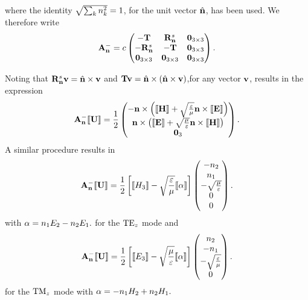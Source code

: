 where the identity $\sqrt{\sum_{k} n_{k}^2} = 1$, for the unit vector $\hat{\mathbf{n}}$, has been used. We therefore write
\begin{align*}
\mathbf{A}_\mathbf{n}^{-} = c
\begin{pmatrix}
  -\mathbf{T} & \mathbf{R}^{s}_{\mathbf{n}} & \mathbf{0}_{3\times3} \\
  -\mathbf{R}^{s}_{\mathbf{n}}  & -\mathbf{T} & \mathbf{0}_{3\times3} \\
   \mathbf{0}_{3\times3} & \mathbf{0}_{3\times3} & \mathbf{0}_{3\times3} 
\end{pmatrix} .
\end{align*}

Noting that $\mathbf{R}^{s}_{\mathbf{n}} \mathbf{v} = \hat{\mathbf{n}} \times \mathbf{v}$ and $\mathbf{T} \mathbf{v} = \hat{\mathbf{n}} \times \left(  \hat{\mathbf{n}}
  \times \mathbf{v} \right)$,for any vector $\mathbf{v}$, results in the expression
\begin{align}
\mathbf{A}_\mathbf{n}^{-} \llbracket \mathbf{U} \rrbracket = \frac{1}{2}
\begin{pmatrix}
  -\mathbf{n} \times \left( \llbracket \mathbf{H} \rrbracket + \sqrt{\frac{\varepsilon}{\mu}} \mathbf{n} \times \llbracket \mathbf{E} \rrbracket \right) \\
   \mathbf{n} \times \left( \llbracket \mathbf{E} \rrbracket + \sqrt{\frac{\mu}{\varepsilon}} \mathbf{n} \times \llbracket \mathbf{H} \rrbracket \right) \\
  \mathbf{0}_3
\end{pmatrix} .
  \label{eq:AnMinuU-expression-3D}
\end{align}
A similar procedure results in
\begin{align}
\mathbf{A}_\mathbf{n}^{-} \llbracket \mathbf{U} \rrbracket =
  \frac{1}{2}
  \left[
    \llbracket H_3 \rrbracket - \sqrt{\frac{\varepsilon}{\mu}} \llbracket \alpha \rrbracket
  \right]
\begin{pmatrix}
   -n_2 \\
   n_1 \\
   - \sqrt{ \frac{\mu}{\varepsilon} } \\
   0  \\
   0 
\end{pmatrix} . \label{eq:AnMinuU-expression-TE}
\end{align}
with $ \alpha = n_1 E_2 - n_2 E_1. $ for the $\textrm{TE}_{z}$ mode and
\begin{align}
\mathbf{A}_\mathbf{n}^{-} \llbracket \mathbf{U} \rrbracket =
  \frac{1}{2}
  \left[
    \llbracket E_3 \rrbracket - \sqrt{\frac{\mu}{\varepsilon}} \llbracket \alpha \rrbracket
  \right]
\begin{pmatrix}
   n_2 \\
   -n_1 \\
   -\sqrt{ \frac{\varepsilon}{\mu} } \\
   0 
\end{pmatrix} . \label{eq:AnMinuU-expression-TM}
\end{align}
for the $\textrm{TM}_{z}$ mode with $ \alpha = - n_1 H_2 + n_2 H_1. $

